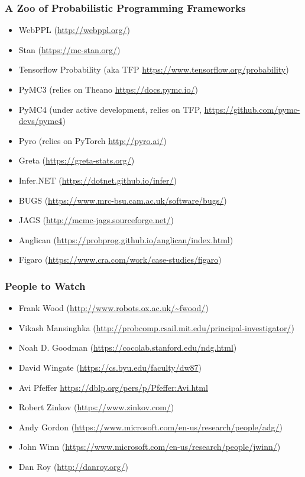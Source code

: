 \documentclass[usenames,dvipsnames]{beamer}
\begin{document}
\begin{frame}
  \frametitle{A Zoo of Probabilistic Programming Frameworks}
  \begin{itemize}
    \item WebPPL (\url{http://webppl.org/})
    \item Stan (\url{https://mc-stan.org/})
    \item Tensorflow Probability (aka TFP
      \url{https://www.tensorflow.org/probability})
    \item PyMC3 (relies on Theano \url{https://docs.pymc.io/})
    \item PyMC4 (under active development, relies on TFP,
      \url{https://github.com/pymc-devs/pymc4})
    \item Pyro (relies on PyTorch \url{http://pyro.ai/})
    \item Greta (\url{https://greta-stats.org/})
    \item Infer.NET (\url{https://dotnet.github.io/infer/})
    \item BUGS (\url{https://www.mrc-bsu.cam.ac.uk/software/bugs/})
    \item JAGS (\url{http://mcmc-jags.sourceforge.net/})
    \item Anglican (\url{https://probprog.github.io/anglican/index.html})
    \item Figaro (\url{https://www.cra.com/work/case-studies/figaro})
  \end{itemize}
\end{frame}
\begin{frame}
  \frametitle{People to Watch}
  \begin{itemize}
    \item Frank Wood (\url{http://www.robots.ox.ac.uk/~fwood/})
    \item Vikash Mansinghka
      (\url{http://probcomp.csail.mit.edu/principal-investigator/})
    \item Noah D. Goodman (\url{https://cocolab.stanford.edu/ndg.html})
    \item David Wingate (\url{https://cs.byu.edu/faculty/dw87})
    \item Avi Pfeffer \url{https://dblp.org/pers/p/Pfeffer:Avi.html}
    \item Robert Zinkov (\url{https://www.zinkov.com/})
      \item Andy Gordon
      (\url{https://www.microsoft.com/en-us/research/people/adg/})
      \item John Winn
      (\url{https://www.microsoft.com/en-us/research/people/jwinn/})
    \item Dan Roy (\url{http://danroy.org/})
  \end{itemize}
\end{frame}
\end{document}
